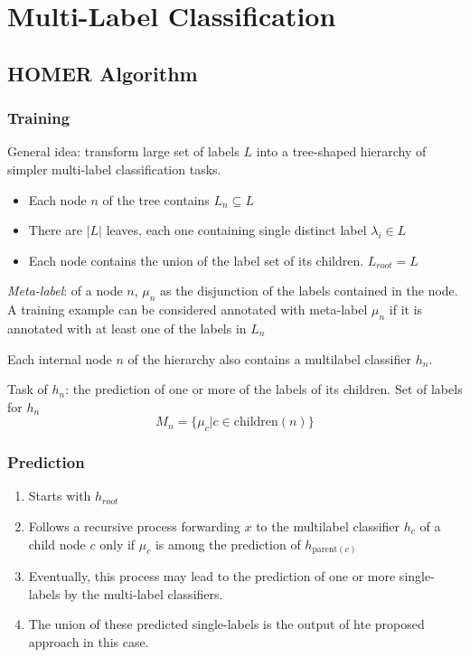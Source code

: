 \section{Multi-Label Classification}
\subsection{HOMER Algorithm}
\subsubsection{Training}
General idea: transform large set of labels $L$ into a tree-shaped
hierarchy of simpler multi-label classification tasks.
\begin{itemize}
    \item Each node $n$ of the tree contains $L_n \subseteq L$
    \item There are $|L|$ leaves, each one containing single distinct
        label $\lambda_i \in L$
    \item Each node contains the union of the label set of its children.
        $L_{root} = L$
\end{itemize}

\emph{Meta-label}: of a node $n$, $\mu_n$ as the disjunction of the labels
contained in the node. A training example can be considered annotated with
meta-label $\mu_n$ if it is annotated with at least one of the labels in
$L_n$

Each internal node $n$ of the hierarchy also contains a multilabel
classifier $h_n$. 

Task of $h_n$: the prediction of one or more of the labels of its
children. Set of labels for $h_n$
\[
    M_n = \{ \mu_c | c \in \mbox{children}(n)\}
\]


\subsubsection{Prediction}
\begin{enumerate}
    \item Starts with $h_{root}$
    \item Follows a recursive process forwarding $x$ to the multilabel
        classifier $h_c$ of a child node $c$ only if $\mu_c$ is among the
        prediction of $h_{\mbox{parent}(c)}$
    \item Eventually, this process may lead to the prediction of one or
        more single-labels by the multi-label classifiers.
    \item The union of these predicted single-labels is the output of hte
        proposed approach in this case.
\end{enumerate}
